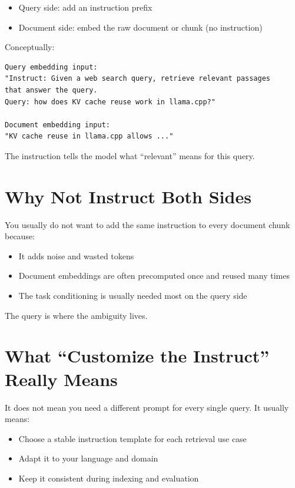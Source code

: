 \begin{itemize}
    \item Query side: add an instruction prefix
    \item Document side: embed the raw document or chunk (no instruction)
\end{itemize}

Conceptually:

\begin{Verbatim}
Query embedding input:
"Instruct: Given a web search query, retrieve relevant passages
that answer the query.
Query: how does KV cache reuse work in llama.cpp?"

Document embedding input:
"KV cache reuse in llama.cpp allows ..."
\end{Verbatim}

The instruction tells the model what ``relevant'' means for this query.

\section{Why Not Instruct Both Sides}

You usually do not want to add the same instruction to every document chunk because:

\begin{itemize}
    \item It adds noise and wasted tokens
    \item Document embeddings are often precomputed once and reused many times
    \item The task conditioning is usually needed most on the query side
\end{itemize}

The query is where the ambiguity lives.

\section{What ``Customize the Instruct'' Really Means}

It does not mean you need a different prompt for every single query. It usually means:

\begin{itemize}
    \item Choose a stable instruction template for each retrieval use case
    \item Adapt it to your language and domain
    \item Keep it consistent during indexing and evaluation
\end{itemize}


